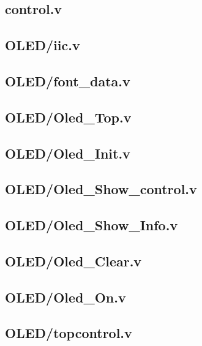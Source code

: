 \documentclass[12pt,a4paper]{ctexart}
\begin{document}
\subsection{control.v}



\subsection{OLED/iic.v}



\subsection{OLED/font\_data.v}



\subsection{OLED/Oled\_Top.v}



\subsection{OLED/Oled\_Init.v}



\subsection{OLED/Oled\_Show\_control.v}



\subsection{OLED/Oled\_Show\_Info.v}



\subsection{OLED/Oled\_Clear.v}



\subsection{OLED/Oled\_On.v}



\subsection{OLED/topcontrol.v}


\end{document}
